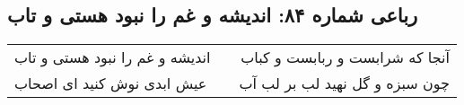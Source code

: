 \begin{center}
\section*{رباعی شماره ۸۴: اندیشه و غم را نبود هستی و تاب}
\label{sec:0084}
\begin{longtable}{l p{0.5cm} r}
اندیشه و غم را نبود هستی و تاب
&&
آنجا که شرابست و ربابست و کباب
\\
عیش ابدی نوش کنید ای اصحاب
&&
چون سبزه و گل نهید لب بر لب آب
\\
\end{longtable}
\end{center}
